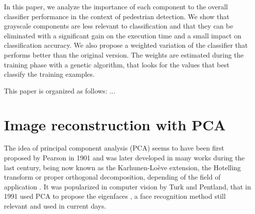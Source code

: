 \documentclass[10pt, conference, compsocconf]{IEEEtran}
\begin{document}


In this paper, we analyze the importance of each component to the overall classifier performance in the context of pedestrian detection. We show that grayscale components are less relevant to classification and that they can be eliminated with a significant gain on the execution time and a small impact on classification accuracy. We also propose a weighted variation of the classifier that performs better than the original version. The weights are estimated during the training phase with a genetic algorithm, that looks for the values that best classify the training examples.

This paper is organized as follows: ... 

\section{Image reconstruction with PCA}

The idea of principal component analysis (PCA) seems to have been first proposed by Pearson in 1901 \cite{pearson1901} and was later developed in many works during the last century, being now known as the Karhunen-Loève extension, the Hotelling transform or proper orthogonal decomposition, depending of the field of application \cite{sirovich87}. It was popularized in computer vision by Turk and Pentland, that in 1991 used PCA to propose the eigenfaces \cite{turk91}, a face recognition method still relevant and used in current days. %
\end{document}
